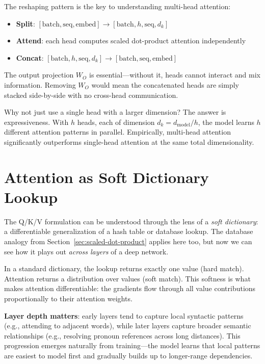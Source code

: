 \begin{keyconcept}
  The reshaping pattern is the key to understanding multi-head attention:
  \begin{itemize}
    \item \textbf{Split}: $[\text{batch}, \text{seq}, \text{embed}] \rightarrow
          [\text{batch}, h, \text{seq}, d_k]$
    \item \textbf{Attend}: each head computes scaled dot-product attention
          independently
    \item \textbf{Concat}: $[\text{batch}, h, \text{seq}, d_k] \rightarrow
          [\text{batch}, \text{seq}, \text{embed}]$
  \end{itemize}
  The output projection $W_O$ is essential---without it, heads cannot
  interact and mix information. Removing $W_O$ would mean the concatenated
  heads are simply stacked side-by-side with no cross-head communication.
\end{keyconcept}

Why not just use a single head with a larger dimension? The answer is
expressiveness. With $h$ heads, each of dimension $d_k = d_{\text{model}}/h$,
the model learns $h$ different attention patterns in parallel. Empirically,
multi-head attention significantly outperforms single-head attention at the
same total dimensionality.

\section{Attention as Soft Dictionary Lookup}

The Q/K/V formulation can be understood through the lens of a \emph{soft
dictionary}: a differentiable generalization of a hash table or database
lookup. The database analogy from Section~\ref{sec:scaled-dot-product} applies here too, but now we can
see how it plays out \emph{across layers} of a deep network.

In a standard dictionary, the lookup returns exactly one value (hard match).
Attention returns a distribution over values (soft match). This softness is
what makes attention differentiable: the gradients flow through all
value contributions proportionally to their attention weights.

\begin{keyconcept}
  \textbf{Layer depth matters}: early layers tend to capture local
  syntactic patterns (e.g., attending to adjacent words), while later
  layers capture broader semantic relationships (e.g., resolving pronoun
  references across long distances). This progression emerges naturally
  from training---the model learns that local patterns are easiest to model
  first and gradually builds up to longer-range dependencies.
\end{keyconcept}

